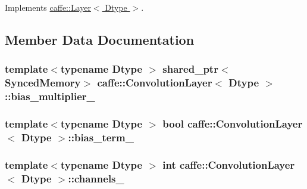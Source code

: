 Implements \hyperlink{classcaffe_1_1_layer_abd13c6489c13953b4fbcfcf6880835d0}{caffe\+::\+Layer$<$ Dtype $>$}.



\subsection{Member Data Documentation}
\hypertarget{classcaffe_1_1_convolution_layer_a587cf49430daaacbd570e6a97c4364d2}{
\subsubsection[{bias\+\_\+multiplier\+\_\+}]{\setlength{\rightskip}{0pt plus 5cm}template$<$typename Dtype $>$ shared\+\_\+ptr$<${\bf Synced\+Memory}$>$ {\bf caffe\+::\+Convolution\+Layer}$<$ Dtype $>$\+::bias\+\_\+multiplier\+\_\+\hspace{0.3cm}{\ttfamily [protected]}}}\label{classcaffe_1_1_convolution_layer_a587cf49430daaacbd570e6a97c4364d2}
\hypertarget{classcaffe_1_1_convolution_layer_a0e8fbac1d24ba656fa6593191b21b32b}{
\subsubsection[{bias\+\_\+term\+\_\+}]{\setlength{\rightskip}{0pt plus 5cm}template$<$typename Dtype $>$ bool {\bf caffe\+::\+Convolution\+Layer}$<$ Dtype $>$\+::bias\+\_\+term\+\_\+\hspace{0.3cm}{\ttfamily [protected]}}}\label{classcaffe_1_1_convolution_layer_a0e8fbac1d24ba656fa6593191b21b32b}
\hypertarget{classcaffe_1_1_convolution_layer_ad70d4cbdcb75695b05b13bc479445aec}{
\subsubsection[{channels\+\_\+}]{\setlength{\rightskip}{0pt plus 5cm}template$<$typename Dtype $>$ int {\bf caffe\+::\+Convolution\+Layer}$<$ Dtype $>$\+::channels\+\_\+\hspace{0.3cm}{\ttfamily [protected]}}}\label{classcaffe_1_1_convolution_layer_ad70d4cbdcb75695b05b13bc479445aec}
